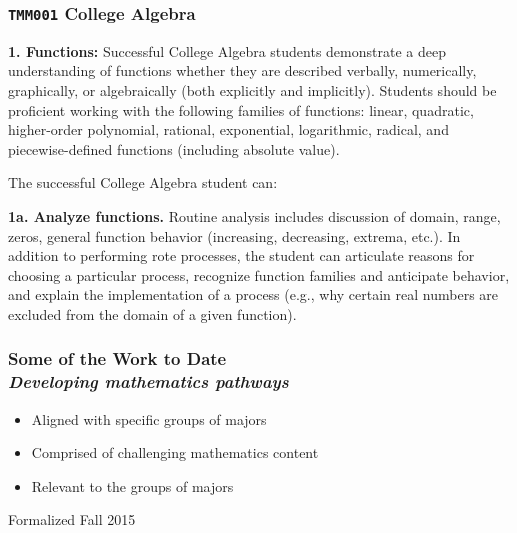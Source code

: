 \documentclass[14pt]{beamer}
\newcounter{a}
\newcounter{b}
\begin{document}
\begin{frame}
  \frametitle{\texttt{TMM001} College Algebra}

\footnotesize

\parbox{\textwidth}{\textbf{1. Functions:}
Successful College Algebra students demonstrate a deep understanding of 
functions whether they are described verbally, numerically, graphically, or algebraically (both 
explicitly and implicitly). Students should be proficient working with the following families of functions:  linear, quadratic, higher-order polynomial, rational, exponential, logarithmic, radical, and piecewise-defined functions (including absolute value).}

\vfill

The successful College Algebra student can:

\null\hfill\parbox{0.95\textwidth}{\textbf{1a. Analyze functions.}  Routine analysis includes discussion of domain, range, zeros, general function behavior (increasing, decreasing, extrema, etc.). In addition to performing rote processes, the student can articulate reasons for choosing a particular process, recognize function families and anticipate behavior, 
and explain the implementation of a process (e.g., why certain real numbers are excluded from the domain of a given function).}

\end{frame}


\begin{frame}
  \frametitle{Some of the Work to Date \\
\textit{Developing mathematics pathways}}

\begin{itemize}
\item Aligned with specific groups of majors
\item Comprised of challenging mathematics content
\item Relevant to the groups of majors
\end{itemize}

\vfill\hfill\textcolor{dark}{\footnotesize Formalized Fall 2015}
\end{frame}
\end{document}
